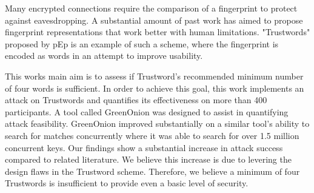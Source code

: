 Many encrypted connections require the comparison of a fingerprint to protect against eavesdropping. A substantial amount of past work has aimed to propose fingerprint representations that work better with human limitations. "Trustwords" proposed by pEp is an example of such a scheme, where the fingerprint is encoded as words in an attempt to improve usability.

This works main aim is to assess if Trustword's recommended minimum number of four words is sufficient.
In order to achieve this goal, this work implements an attack on Trustwords and quantifies its effectiveness on more than 400 participants.  A tool called GreenOnion was designed to assist in quantifying attack feasibility. GreenOnion improved substantially on a similar tool's ability to search for matches concurrently where it was able to search for over 1.5 million concurrent keys. Our findings show a substantial increase in attack success compared to related literature. We believe this increase is due to levering the design flaws in the Trustword scheme. Therefore, we believe a minimum of four Trustwords is insufficient to provide even a basic level of security.
